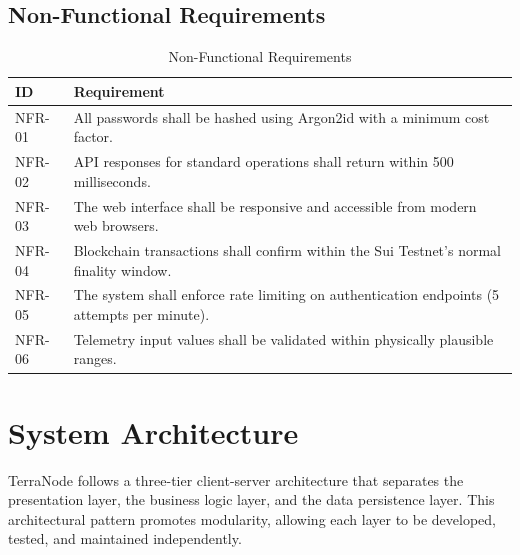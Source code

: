 \subsection{Non-Functional Requirements}

\begin{table}[H]
\centering
\caption{Non-Functional Requirements}
\label{tab:nonfunctional_req}
\begin{tabularx}{\textwidth}{|l|X|}
\hline
\textbf{ID} & \textbf{Requirement} \\
\hline
NFR-01 & All passwords shall be hashed using Argon2id with a minimum cost factor. \\
\hline
NFR-02 & API responses for standard operations shall return within 500 milliseconds. \\
\hline
NFR-03 & The web interface shall be responsive and accessible from modern web browsers. \\
\hline
NFR-04 & Blockchain transactions shall confirm within the Sui Testnet's normal finality window. \\
\hline
NFR-05 & The system shall enforce rate limiting on authentication endpoints (5 attempts per minute). \\
\hline
NFR-06 & Telemetry input values shall be validated within physically plausible ranges. \\
\hline
\end{tabularx}
\end{table}

\section{System Architecture}

TerraNode follows a three-tier client-server architecture that separates the presentation layer, the business logic layer, and the data persistence layer. This architectural pattern promotes modularity, allowing each layer to be developed, tested, and maintained independently.

